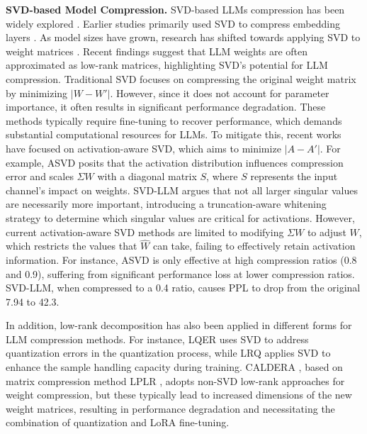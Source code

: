 \textbf{SVD-based Model Compression.}
SVD-based LLMs compression has been widely explored \citep{3,4,5}. Earlier studies primarily used SVD to compress embedding layers \citep{1,2}. As model sizes have grown, research has shifted towards applying SVD to weight matrices \citep{6,7}. Recent findings \citep{truth} suggest that LLM weights are often approximated as low-rank matrices, highlighting SVD's potential for LLM compression. Traditional SVD focuses on compressing the original weight matrix by minimizing $|W - W'|$. However, since it does not account for parameter importance, it often results in significant performance degradation. These methods typically require fine-tuning to recover performance, which demands substantial computational resources for LLMs.
To mitigate this, recent works have focused on activation-aware SVD, which aims to minimize $|A - A'|$. For example, ASVD posits that the activation distribution influences compression error and scales $\Sigma W$ with a diagonal matrix $S$, where $S$ represents the input channel’s impact on weights. SVD-LLM argues that not all larger singular values are necessarily more important, introducing a truncation-aware whitening strategy to determine which singular values are critical for activations. 
However, current activation-aware SVD methods are limited to modifying $\Sigma W$ to adjust $W$, which restricts the values that $\hat{W}$ can take, failing to effectively retain activation information. For instance, ASVD is only effective at high compression ratios (0.8 and 0.9), suffering from significant performance loss at lower compression ratios. SVD-LLM, when compressed to a 0.4 ratio, causes PPL to drop from the original 7.94 to 42.3.


In addition, low-rank decomposition has also been applied in different forms for LLM compression methods. For instance, LQER \citep{lowrank_1} uses SVD to address quantization errors in the quantization process, while LRQ \citep{lowrank_3} applies SVD to enhance the sample handling capacity during training. CALDERA \citep{lowrank_4}, based on matrix compression method LPLR \citep{lowrank_2}, adopts non-SVD low-rank approaches for weight compression, but these typically lead to increased dimensions of the new weight matrices, resulting in performance degradation and necessitating the combination of quantization and LoRA fine-tuning.